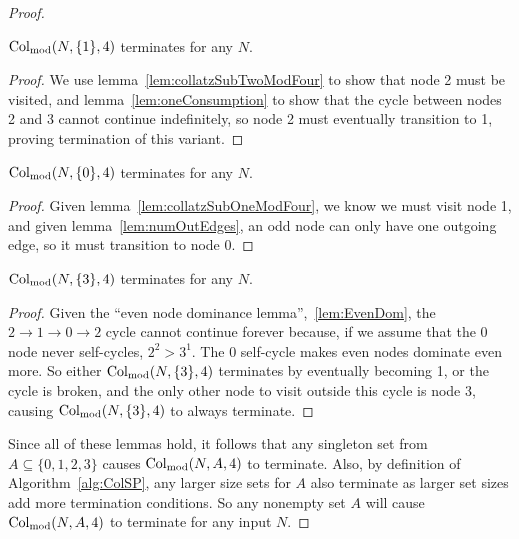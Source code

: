\begin{proof}
\begin{lemma}
\label{lem:collatzSubOneModFour}
$\mathrm{Col}_{\text{mod}}(N,\{1\},4)$ terminates for any $N$.
\end{lemma}
\begin{proof}
We use lemma~\ref{lem:collatzSubTwoModFour} to show that node 2 must be visited, and lemma~\ref{lem:oneConsumption} to show that the cycle between nodes 2 and 3 cannot continue indefinitely, so node 2 must eventually transition to 1, proving termination of this variant.
\end{proof}
\begin{lemma}
\label{lem:collatzSubZeroModFour}
$\mathrm{Col}_{\text{mod}}(N,\{0\},4)$ terminates for any $N$.
\end{lemma}
\begin{proof}
Given lemma~\ref{lem:collatzSubOneModFour}, we know we must visit node 1, and given lemma~\ref{lem:numOutEdges}, an odd node can only have one outgoing edge, so it must transition to node 0.
\end{proof}
\begin{lemma}
\label{lem:collatzSubThreeModFour}
$\mathrm{Col}_{\text{mod}}(N,\{3\},4)$ terminates for any $N$.
\end{lemma}
\begin{proof}
Given the ``even node dominance lemma'',~\ref{lem:EvenDom}, the $2 \rightarrow 1 \rightarrow 0 \rightarrow 2$ cycle cannot continue forever because, if we assume that the 0 node never self-cycles, $2^2 > 3^1$. The 0 self-cycle makes even nodes dominate even more. So either $\mathrm{Col}_{\text{mod}}(N,\{3\},4)$ terminates by eventually becoming 1, or the cycle is broken, and the only other node to visit outside this cycle is node 3,  causing $\mathrm{Col}_{\text{mod}}(N,\{3\},4)$ to always terminate.
\end{proof}
Since all of these lemmas hold, it follows that any singleton set from $A \subseteq \{0,1,2,3\}$ causes $\mathrm{Col}_{\text{mod}}(N,A,4)$ to terminate. Also, by definition of Algorithm~\ref{alg:ColSP}, any larger size sets for $A$ also terminate as larger set sizes add more termination conditions. So any nonempty set $A$ will cause $\mathrm{Col}_{\text{mod}}(N,A,4)$ to terminate for any input $N$.
\end{proof}
